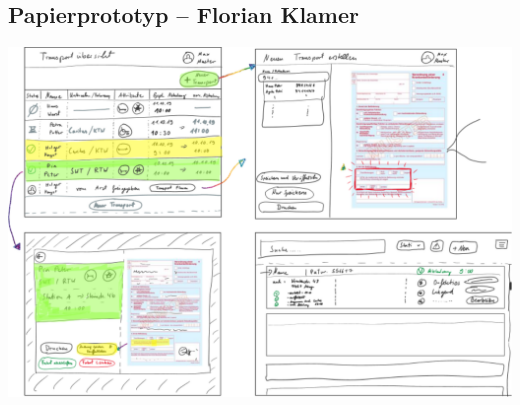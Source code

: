 \documentclass[a4paper, ngerman, 12pt]{scrartcl}
\begin{document}
\subsection{Papierprototyp – Florian Klamer}
\begin{center}
\begin{minipage}[b]{0.7\textwidth}
	\centering
	\includegraphics[width=\textwidth]{Bilder/prototypFlo.pdf}
	\label{img:klamer}
\end{minipage}
\end{center}
\end{document}
